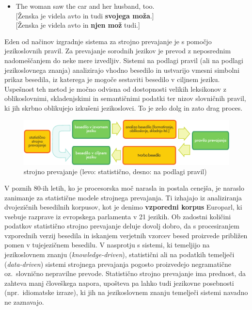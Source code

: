 \begin{multicols}{2}
\begin{itemize}
\item[] The woman saw the car and her husband, too.\\[1mm]
  {[}Ženska je videla avto in tudi \textbf{svojega moža}.{]}\\
  {[}Ženska je videla avto in \textbf{njen mož} tudi.{]}
\end{itemize}

Eden od načinov izgradnje sistema za stroj\-no prevajanje je s pomočjo jezikoslovnih pravil. Za prevajanje sorodnih jezikov je prevod z neposrednim nadomeščanjem do neke mere izvedljiv. Sistemi na podlagi pravil (ali na podlagi jezikoslovnega znanja) analizirajo vhodno besedilo in ustvarijo vmesni simbolni prikaz besedila, iz katerega je mogoče sestaviti besedilo v ciljnem jeziku. Uspešnost teh metod je močno odvisna od dostopnosti velikih leksikonov z oblikoslovnimi, skladenjskimi in semantičnimi podatki ter nizov slovničnih pravil, ki jih skrbno oblikujejo izkušeni jezikoslovci. To je zelo dolg in zato drag proces.

\begin{figure}[htb]
  \center
  \includegraphics[width=\textwidth]{../_media/slovene/machine_translation}
  \caption{strojno prevajanje (levo: statistično, desno: na podlagi pravil)}
  \label{fig:mtarch_de}
\end{figure}

V poznih 80-ih letih, ko je procesorska moč narasla in postala cenej\-ša, je naraslo zanimanje za statistične mo\-dele stroj\-nega prevajanja. Ti izhajajo iz analiziranja dvojezičnih besedilnih korpusov, kot je denimo \textbf{vzporedni korpus} Europarl, ki vsebuje razprave iz evropskega parlamenta v 21 jezikih. Ob zadostni količini podatkov statistično stroj\-no prevajanje deluje dovolj dobro, da s procesiranjem vzporednih verzij besedila in iskanjem verjetnih vzorcev besed proizvede približen po\-men v tujejezičnem besedilu. V nasprotju s sistemi, ki temeljijo na jezikoslovnem znanju (\textit{knowledge-driven}), statistični ali na podatkih temelječi (\textit{data-driven}) sistemi stroj\-nega prevajanja pogosto proizvedejo negramatične oz.~slovnično nepravilne prevode. Statistično stroj\-no prevajanje ima prednost, da zah\-teva manj človeškega napora, upošteva pa lahko tudi jezikovne posebnosti (npr.~idiomatske izraze), ki jih na jezikoslovnem znanju temelječi sistemi navadno ne zaznavajo.


\end{multicols}

